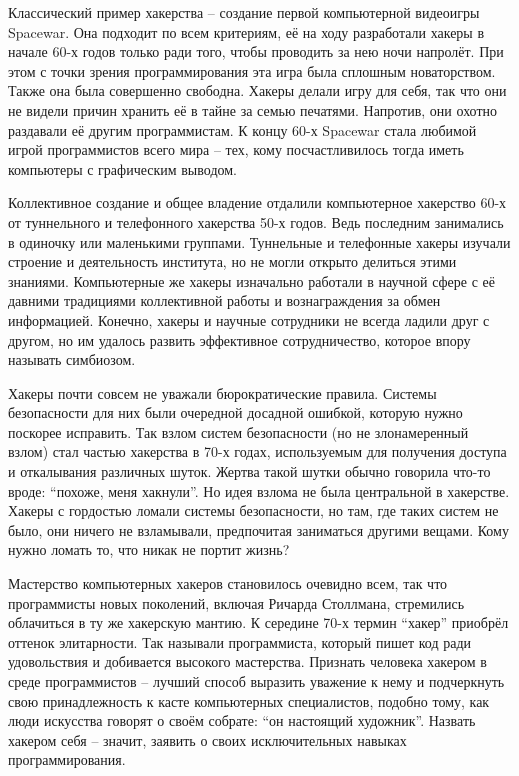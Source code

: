 Классический пример хакерства -- создание первой компьютерной видеоигры Spacewar. Она подходит по всем критериям, её на ходу разработали хакеры в начале 60-х годов только ради того, чтобы проводить за нею ночи напролёт. При этом с точки зрения программирования эта игра была сплошным новаторством. Также она была совершенно свободна. Хакеры делали игру для себя, так что они не видели причин хранить её в тайне за семью печатями. Напротив, они охотно раздавали её другим программистам. К концу 60-х Spacewar стала любимой игрой программистов всего мира -- тех, кому посчастливилось тогда иметь компьютеры с графическим выводом.

Коллективное создание и общее владение отдалили компьютерное хакерство 60-х от туннельного и телефонного хакерства 50-х годов. Ведь последним занимались в одиночку или маленькими группами. Туннельные и телефонные хакеры изучали строение и деятельность института, но не могли открыто делиться этими знаниями. Компьютерные же хакеры изначально работали в научной сфере с её давними традициями коллективной работы и вознаграждения за обмен информацией. Конечно, хакеры и научные сотрудники не всегда ладили друг с другом, но им удалось развить эффективное сотрудничество, которое впору называть симбиозом.

Хакеры почти совсем не уважали бюрократические правила. Системы безопасности для них были очередной досадной ошибкой, которую нужно поскорее исправить. Так взлом систем безопасности (но не злонамеренный взлом) стал частью хакерства в 70-х годах, используемым для получения доступа и откалывания различных шуток. Жертва такой шутки обычно говорила что-то вроде: \enquote{похоже, меня хакнули}. Но идея взлома не была центральной в хакерстве. Хакеры с гордостью ломали системы безопасности, но там, где таких систем не было, они ничего не взламывали, предпочитая заниматься другими вещами. Кому нужно ломать то, что никак не портит жизнь?

Мастерство компьютерных хакеров становилось очевидно всем, так что программисты новых поколений, включая Ричарда Столлмана, стремились облачиться в ту же хакерскую мантию. К середине 70-х термин \enquote{хакер} приобрёл оттенок элитарности. Так называли программиста, который пишет код ради удовольствия и добивается высокого мастерства. Признать человека хакером в среде программистов -- лучший способ выразить уважение к нему и подчеркнуть свою принадлежность к касте компьютерных специалистов, подобно тому, как люди искусства говорят о своём собрате: \enquote{он настоящий художник}. Назвать хакером себя -- значит, заявить о своих исключительных навыках программирования.

